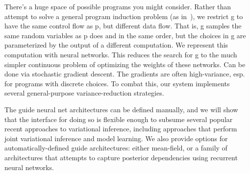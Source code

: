 There's a huge space of possible programs you might consider.
Rather than attempt to solve a general program induction problem (as in~\cite{GuidePrograms}), we restrict g to have the same control flow as p, but different data flow.
That is, g samples the same random variables as p does and in the same order, but the choices in g are parameterized by the output of a different computation.
We represent this computation with neural networks.
This reduces the search for g to the much simpler continuous problem of optimizing the weights of these networks.
Can be done via stochastic gradient descent.
The gradients are often high-variance, esp. for programs with discrete choices.
To combat this, our system implements several general-purpose variance-reduction strategies.

The guide neural net architectures can be defined manually, and we will show that the interface for doing so is flexible enough to subsume several popular recent approaches to variational inference, including approaches that perform joint variational inference and model learning.
We also provide options for automatically-defined guide architectures: either mean-field, or a family of architectures that attempts to capture posterior dependencies using recurrent neural networks.